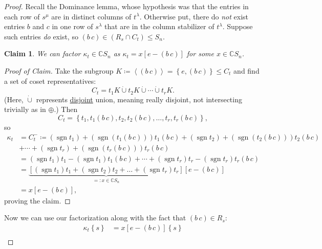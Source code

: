 \documentclass[12pt]{article}
\newcommand{\cx}{\mathbb{C}}
\newcommand{\ita}[1]{\textit{#1}}
\newcommand\paren[1]{\left( #1 \right)}
\newcommand\setb[1]{\left \{ #1 \right \}}
\newcommand{\vbrack}[1]{\left \langle #1 \right \rangle}
\newtheorem*{claim}{Claim}
\theoremstyle{definition}
\DeclareMathOperator\sgn{sgn}
\begin{document}
\begin{proof}
    Recall the Dominance lemma, whose hypothesis was that the entries in each row of $s^{\mu}$ are in distinct columns of $t^{\lambda}$. Otherwise put, there do \ita{not} exist entries $b$ and $c$ in one row of $s^{\lambda}$ that are in the column stabilizer of $t^{\lambda}$. Suppose such entries \ita{do} exist, so $(b\,c) \in \paren{ R_s \cap C_t } \leq S_n$.
    \begin{claim}
        We can factor $\kappa_t \in \cx S_n$ as $\kappa_t = x \left[ e - (b\,c) \right]$ for some $x \in \cx S_n$.
    \end{claim}
    \begin{proof}[Proof of Claim]
        Take the subgroup $K \coloneqq  \vbrack{ (b\,c) } = \setb{ e , (b\,c) } \leq C_t$ and find a set of coset representatives:
        \begin{equation*}
            C_t = t_1 K \dot{\cup} t_2 K \dot{\cup} \dotsb \dot{\cup} t_r K.
        \end{equation*}
        (Here, $\dot{\cup}$ represents \underline{disjoint} union, meaning really disjoint, not intersecting trivially as in $\oplus$.) Then 
        \begin{equation*}
            C_t = \setb{ t_1 , t_1 (b\,c) , t_2 , t_2 (b\,c) , \dotsc, t_r , t_r (b\,c) },
        \end{equation*}
        so 
        \begin{align*}
            \kappa_t & = C_t^- \coloneqq  \paren{ \sgn t_1 } + \paren{ \sgn \paren{ t_1 (b\,c) } } t_1 (b\,c) + \paren{ \sgn t_2 } + \paren{ \sgn \paren{ t_2 (b\,c) } } t_2 (b\,c) \\
            & + \dotsb + \paren{ \sgn t_r } + \paren{ \sgn \paren{ t_r (b\,c) } } t_r (b\,c) \\
            & = \paren{ \sgn t_1 } t_1 - \paren{ \sgn t_1 } t_1 (b\,c) + \dotsb + \paren{ \sgn t_r } t_r - \paren{ \sgn t_r } t_r (b\,c) \\
            & = \underbrace{ \left[ \paren{ \sgn t_1 } t_1 + \paren{ \sgn t_2 } t_2 + \dotsc + \paren{ \sgn t_r } t_r \right] }_{ =: x \in \cx S_n } \left[ e - (b\,c) \right] \\
            & = x \left[ e - (b\,c) \right],
        \end{align*}
        proving the claim.
    \end{proof}
    Now we can use our factorization along with the fact that $(b\,c) \in R_s$:
    \begin{align*}
        \kappa_t \setb{ s } & = x \left[ e - (b\,c) \right] \setb{ s } \\

\end{align*}
\end{proof}
\end{document}

